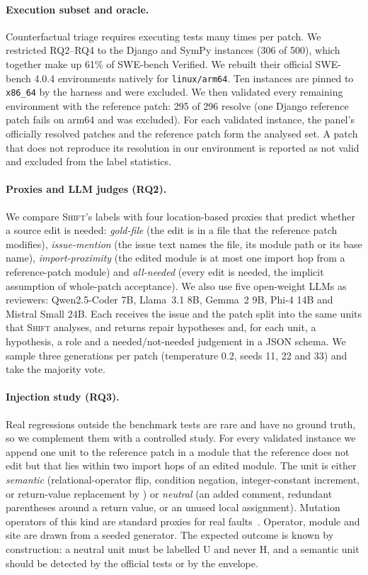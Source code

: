 \documentclass[a4paper,fleqn]{cas-sc}
\newcommand{\tool}{\textsc{Shift}}
\newcommand{\code}[1]{\texttt{\detokenize{#1}}}
\newcommand{\lab}[1]{\textsf{#1}}
\begin{document}
\paragraph{Execution subset and oracle.} Counterfactual triage requires executing tests many times per patch. We restricted RQ2--RQ4 to the Django and SymPy instances (306 of 500), which together make up 61\% of SWE-bench Verified. We rebuilt their official SWE-bench 4.0.4 environments natively for \texttt{linux/arm64}. Ten instances are pinned to \texttt{x86\_64} by the harness and were excluded. We then validated every remaining environment with the reference patch: 295 of 296 resolve (one Django reference patch fails on arm64 and was excluded). For each validated instance, the panel's officially resolved patches and the reference patch form the analysed set. A patch that does not reproduce its resolution in our environment is reported as \lab{not valid} and excluded from the label statistics.

\paragraph{Proxies and LLM judges (RQ2).} We compare \tool{}'s labels with four location-based proxies that predict whether a source edit is needed: \emph{gold-file} (the edit is in a file that the reference patch modifies), \emph{issue-mention} (the issue text names the file, its module path or its base name), \emph{import-proximity} (the edited module is at most one import hop from a reference-patch module) and \emph{all-needed} (every edit is needed, the implicit assumption of whole-patch acceptance). We also use five open-weight LLMs as reviewers: Qwen2.5-Coder 7B, Llama~3.1 8B, Gemma~2 9B, Phi-4 14B and Mistral Small 24B. Each receives the issue and the patch split into the same units that \tool{} analyses, and returns repair hypotheses and, for each unit, a hypothesis, a role and a needed/not-needed judgement in a JSON schema. We sample three generations per patch (temperature 0.2, seeds 11, 22 and 33) and take the majority vote.

\paragraph{Injection study (RQ3).} Real regressions outside the benchmark tests are rare and have no ground truth, so we complement them with a controlled study. For every validated instance we append one unit to the reference patch in a module that the reference does not edit but that lies within two import hops of an edited module. The unit is either \emph{semantic} (relational-operator flip, condition negation, integer-constant increment, or return-value replacement by \code{None}) or \emph{neutral} (an added comment, redundant parentheses around a return value, or an unused local assignment). Mutation operators of this kind are standard proxies for real faults~\citep{jia2011mutation,just2014mutants}. Operator, module and site are drawn from a seeded generator. The expected outcome is known by construction: a neutral unit must be labelled \lab{U} and never \lab{H}, and a semantic unit should be detected by the official tests or by the envelope.
\end{document}
